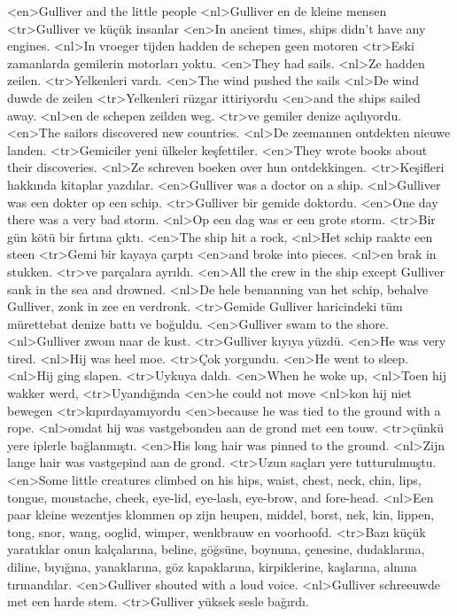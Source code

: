 <en>Gulliver and the little people  
<nl>Gulliver en de kleine mensen  
<tr>Gulliver ve küçük insanlar 
<en>In ancient times, ships didn’t have any engines.
<nl>In vroeger tijden hadden de schepen geen motoren
<tr>Eski zamanlarda gemilerin motorları yoktu.
<en>They had sails.
<nl>Ze hadden zeilen.
<tr>Yelkenleri vardı.
<en>The wind pushed the sails
<nl>De wind duwde de zeilen
<tr>Yelkenleri rüzgar ittiriyordu
<en>and the ships sailed away.
<nl>en de schepen zeilden weg.
<tr>ve gemiler denize açılıyordu.
<en>The sailors discovered new countries.
<nl>De zeemannen ontdekten nieuwe landen.
<tr>Gemiciler yeni ülkeler keşfettiler.
<en>They wrote books about their discoveries.
<nl>Ze schreven boeken over hun ontdekkingen.
<tr>Keşifleri hakkında kitaplar yazdılar.
<en>Gulliver was a doctor on a ship.
<nl>Gulliver was een dokter op een schip.
<tr>Gulliver bir gemide doktordu.
<en>One day there was a very bad storm.
<nl>Op een dag was er een grote storm.
<tr>Bir gün kötü bir fırtına çıktı.
<en>The ship hit a rock,
<nl>Het schip raakte een steen
<tr>Gemi bir kayaya çarptı
<en>and broke into pieces.
<nl>en brak in stukken.
<tr>ve parçalara ayrıldı.
<en>All the crew in the ship except Gulliver sank in the sea and drowned.
<nl>De hele bemanning van het schip, behalve Gulliver, zonk in zee en verdronk.
<tr>Gemide Gulliver haricindeki tüm mürettebat denize battı ve boğuldu.
<en>Gulliver swam to the shore.
<nl>Gulliver zwom naar de kust.
<tr>Gulliver kıyıya yüzdü.
<en>He was very tired.
<nl>Hij was heel moe.
<tr>Çok yorgundu.
<en>He went to sleep.
<nl>Hij ging slapen.
<tr>Uykuya daldı.
<en>When he woke up,
<nl>Toen hij wakker werd,
<tr>Uyandığında
<en>he could not move
<nl>kon hij niet bewegen
<tr>kıpırdayamıyordu
<en>because he was tied to the ground with a rope.
<nl>omdat hij was vastgebonden aan de grond met een touw.
<tr>çünkü yere iplerle bağlanmıştı.
<en>His long hair was pinned to the ground.
<nl>Zijn lange hair was vastgepind aan de grond.
<tr>Uzun saçları yere tutturulmuştu.
<en>Some little creatures climbed on his hips, waist, chest, neck, chin, lips, tongue, moustache, cheek, eye-lid, eye-lash, eye-brow, and fore-head.
<nl>Een paar kleine wezentjes klommen op zijn heupen, middel, borst, nek, kin, lippen, tong, snor, wang, ooglid, wimper, wenkbrauw en voorhoofd.
<tr>Bazı küçük yaratıklar onun kalçalarına, beline, göğsüne, boynuna, çenesine, dudaklarına, diline, bıyığına, yanaklarına, göz kapaklarına, kirpiklerine, kaşlarına, alnına tırmandılar.
<en>Gulliver shouted with a  loud voice.
<nl>Gulliver schreeuwde met  een  harde stem.
<tr>Gulliver yüksek  sesle bağırdı.
